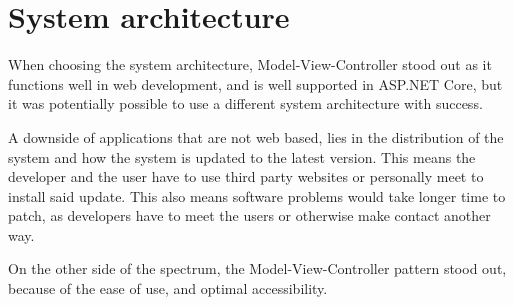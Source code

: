 \section{System architecture}
When choosing the system architecture, Model-View-Controller stood out as it functions well in web development, and is well supported in ASP.NET Core, but it was potentially possible to use a different system architecture with success.

A downside of applications that are not web based, lies in the distribution of the system and how the system is updated to the latest version.
This means the developer and the user have to use third party websites or personally meet to install said update.
This also means software problems would take longer time to patch, as developers have to meet the users or otherwise make contact another way.

On the other side of the spectrum, the Model-View-Controller pattern stood out, because of the ease of use, and optimal accessibility.
